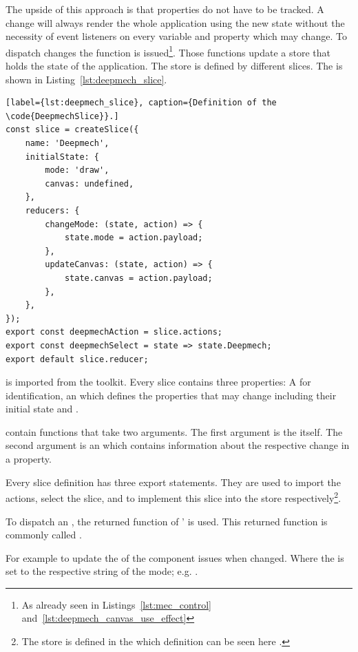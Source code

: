 The upside of this approach is that properties do not have to be tracked.
A change will always render the whole application using the new state without the necessity of event listeners on every variable and property which may change.
To dispatch changes the  function is issued\footnote{As already seen in Listings~\ref{lst:mec_control} and~\ref{lst:deepmech_canvas_use_effect}}.
Those functions update a store that holds the state of the application.
The store is defined by different slices.
The  is shown in Listing~\ref{lst:deepmech_slice}.

\begin{lstlisting}[label={lst:deepmech_slice}, caption={Definition of the \code{DeepmechSlice}}.]
const slice = createSlice({
    name: 'Deepmech',
    initialState: {
        mode: 'draw',
        canvas: undefined,
    },
    reducers: {
        changeMode: (state, action) => {
            state.mode = action.payload;
        },
        updateCanvas: (state, action) => {
            state.canvas = action.payload;
        },
    },
});
export const deepmechAction = slice.actions;
export const deepmechSelect = state => state.Deepmech;
export default slice.reducer;
\end{lstlisting}

 is imported from the  toolkit.
Every slice contains three properties: A  for identification, an  which defines the properties that may change including their initial state and .

 contain functions that take two arguments.
The first argument is the  itself.
The second argument is an  which contains information about the respective change in a  property.

Every slice definition has three export statements.
They are used to import the actions, select the slice, and to implement this slice into the store respectively\footnote{The store is defined in the  which definition can be seen here .}. %

To dispatch an , the returned function of '  is used.
This returned function is commonly called .

For example to update the  of  the  component issues  when changed.
Where the  is set to the respective string of the mode; e.g. .

